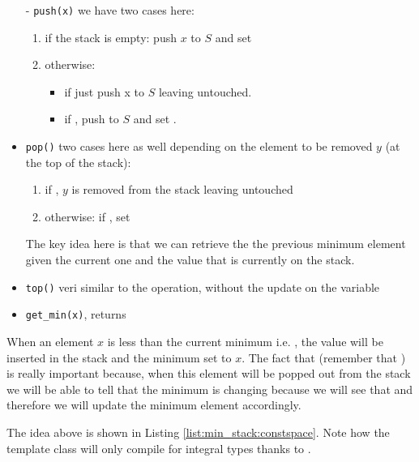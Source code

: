 \begin{itemize}
	\item[-]\lstinline[columns=fixed]{push(x)} we have two cases here:
		\begin{enumerate}
			\item if the stack is empty: push $x$ to $S$ and set 
			\item otherwise: 
			\begin{itemize}
					\item if  just push x to $S$ leaving  untouched. 
					\item if , push  to $S$ and set  .
			\end{itemize}
		\end{enumerate}
	\item[-]\lstinline[columns=fixed]{pop()} two cases here as well depending on the element to be removed $y$ (at the top of the stack):
		\begin{enumerate}
			\item if , $y$ is removed from the stack leaving  untouched
			\item otherwise: if , set 			
		\end{enumerate} 
		The key idea  here is that we can  retrieve the the previous minimum element given the current one and the value that is currently on the stack. 
	\item[-]\lstinline[columns=fixed]{top()} veri similar to the  operation, without the update on the variable  
	\item[-]\lstinline[columns=fixed]{get_min(x)}, returns 
\end{itemize}

When an element $x$ is less than the current minimum i.e. , the value  will be inserted in the stack and the minimum set to $x$. The fact that  (remember that ) is really important because, when this element will be popped out from the stack we will be able to tell that the minimum is changing because we will see that  and therefore we will update the minimum element accordingly.

The idea above is shown in Listing \ref{list:min_stack:constspace}. Note how the template class will only compile for integral types thanks to \cite{cit::std::enableif}. 

